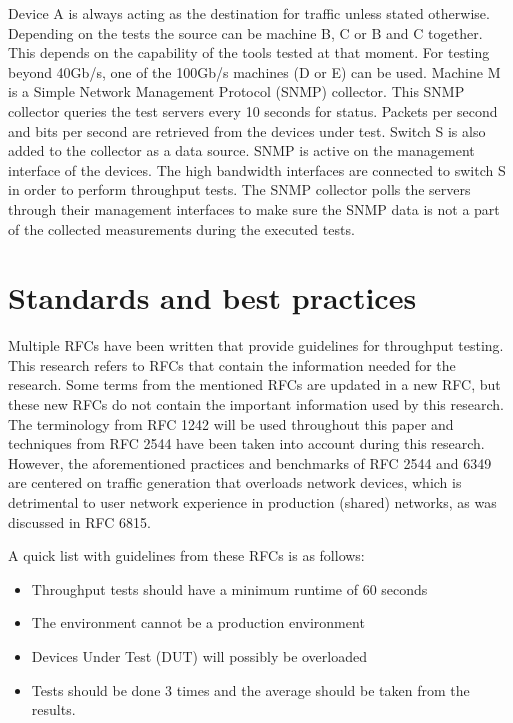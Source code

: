 Device A is always acting as the destination for traffic unless stated otherwise. Depending on the tests the source can be machine B, C or B and C together.
This depends on the capability of the tools tested at that moment.
For testing beyond 40Gb/s, one of the 100Gb/s machines (D or E) can be used.
Machine M is a Simple Network Management Protocol (SNMP) collector. This SNMP collector queries the test servers every 10 seconds for status. 
Packets per second and bits per second are retrieved from the devices under test.
Switch S is also added to the collector as a data source. 
SNMP is active on the management interface of the devices.
The high bandwidth interfaces are connected to switch S in order to perform throughput tests. 
The SNMP collector polls the servers through their management interfaces to make sure the SNMP data is not a part of the collected measurements during the executed tests. 

\section{Standards and best practices}\label{sub:rfc}
Multiple RFCs have been written that provide guidelines for throughput testing.
This research refers to RFCs that contain the information needed for the research.
Some terms from the mentioned RFCs are updated in a new RFC, but these new RFCs do not contain the important information used by this research.
The terminology from RFC 1242\cite{rfc1242} will be used throughout this paper and techniques from RFC 2544 \cite{rfc2544} have been taken into account during this research.
However, the aforementioned practices and benchmarks of RFC 2544 and 6349\cite{rfc6349} are centered on traffic generation that overloads network devices, which is detrimental to user network experience in production (shared) networks, as was discussed in RFC 6815\cite{rfc6815}.

A quick list with guidelines from these RFCs is as follows:

\begin{itemize}
\item{Throughput tests should have a minimum runtime of 60 seconds}
\item{The environment cannot be a production environment}
\item{Devices Under Test (DUT) will possibly be overloaded}
\item{Tests should be done 3 times and the average should be taken from the results.}
\end{itemize} 


